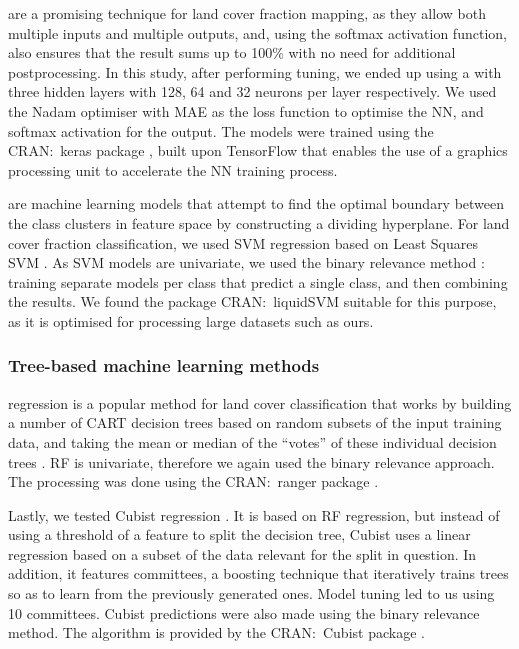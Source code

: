 \documentclass[review,authoryear,3p]{elsarticle}
\newcommand{\cran}[1]{CRAN:~#1}
\begin{document}
 are a promising technique for land cover fraction mapping, as they allow both multiple inputs and multiple outputs, and, using the softmax activation function, also ensures that the result sums up to 100\% with no need for additional postprocessing.
In this study, after performing tuning, we ended up using a  \citep{dreyfus_artificial_1990} with three hidden layers with 128, 64 and 32 neurons per layer respectively.
We used the Nadam optimiser \citep{dozat_incorporating_2016} with \gls{MAE} as the loss function to optimise the \gls{NN}, and softmax activation for the output.
The models were trained using the \cran{keras} package \citep{keras}, built upon TensorFlow that enables the use of a graphics processing unit to accelerate the \gls{NN} training process.

 are machine learning models that attempt to find the optimal boundary between the class clusters in feature space by constructing a dividing hyperplane.
For land cover fraction classification, we used \gls{SVM} regression based on Least Squares \gls{SVM} \citep{suykens_least_1999}.
As \gls{SVM} models are univariate, we used the binary relevance method \citep{karalas2016br}: training separate models per class that predict a single class, and then combining the results.
We found the package \cran{liquidSVM} \citep{liquidSVM} suitable for this purpose, as it is optimised for processing large datasets such as ours.

\subsubsection{Tree-based machine learning methods}

 regression is a popular method for land cover classification that works by building a number of \gls{CART} decision trees based on random subsets of the input training data, and taking the mean or median of the ``votes'' of these individual decision trees \citep{breiman2001random}.
\ac{RF} is univariate, therefore we again used the binary relevance approach.
The processing was done using the \cran{ranger} package \citep{ranger}.

Lastly, we tested Cubist regression \citep{cubist}.
It is based on \gls{RF} regression, but instead of using a threshold of a feature to split the decision tree, Cubist uses a linear regression based on a subset of the data relevant for the split in question.
In addition, it features committees, a boosting technique that iteratively trains trees so as to learn from the previously generated ones.
Model tuning led to us using 10 committees.
Cubist predictions were also made using the binary relevance method.
The algorithm is provided by the \cran{Cubist} package \citep{cubistpackage}.
\end{document}
